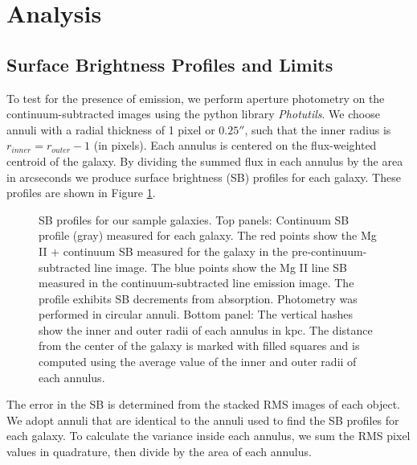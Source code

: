 \documentclass[twocolumn]{aastex62}
\begin{document}
\section{Analysis} \label{sec:analysis}

\subsection{Surface Brightness Profiles and Limits}\label{sec.sb}
To test for the presence of  emission, we perform aperture photometry on the continuum-subtracted images using the python library \emph{Photutils}. We choose annuli with a radial thickness of 1 pixel or $0.25 ''$, such that the inner radius is $r_{inner}=r_{outer}-1$ (in pixels). Each annulus is centered on the flux-weighted centroid of the galaxy. By dividing the summed flux in each annulus by the area in arcseconds we produce surface brightness (SB) profiles for each galaxy. These profiles are shown in Figure \ref{fig:sb_profiles}. 

\begin{figure}
\centering
{}
\caption{SB profiles for our sample galaxies. Top panels: Continuum SB profile (gray) measured for each galaxy. The red points show the Mg II + continuum SB measured for the galaxy in the pre-continuum-subtracted line image. The blue points show the Mg II line SB measured  in the continuum-subtracted line emission image.  The profile exhibits SB decrements from  absorption. Photometry was performed in circular annuli. Bottom panel: The vertical hashes show the inner and outer radii of each annulus in kpc. The distance from the center of the galaxy is marked with filled squares and is computed using the average value of the inner and outer radii of each annulus.}
\label{fig:sb_profiles}
\end{figure}

The error in the SB is determined from the stacked RMS images of each object.  We adopt annuli that are identical to the annuli used to find the SB profiles for each galaxy. To calculate the variance inside each annulus, we sum the RMS pixel values in quadrature, then divide by the area of each annulus. 
\end{document}

